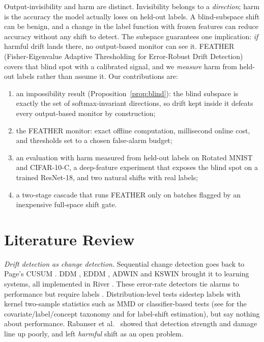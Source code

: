 \documentclass[conference]{IEEEtran}
\begin{document}
Output-invisibility and harm are distinct. Invisibility belongs to a
\emph{direction}; harm is the accuracy the model actually loses on held-out
labels. A blind-subspace shift can be benign, and a change in the label
function with frozen features can reduce accuracy without any shift to detect.
The subspace guarantees one implication: \emph{if} harmful drift lands there,
no output-based monitor can see it. FEATHER (Fisher-Eigenvalue Adaptive
Thresholding for Error-Robust Drift Detection) covers that blind spot with a
calibrated signal, and we \emph{measure} harm from held-out labels rather than
assume it. Our contributions are:
\begin{enumerate}
  \item an impossibility result (Proposition~\ref{prop:blind}): the blind
    subspace is exactly the set of softmax-invariant directions, so drift kept
    inside it defeats every output-based monitor by construction;
  \item the FEATHER monitor: exact offline computation, millisecond online
    cost, and thresholds set to a chosen false-alarm budget;
  \item an evaluation with harm measured from held-out labels on Rotated MNIST
    and CIFAR-10-C, a deep-feature experiment that exposes the blind spot on a
    trained ResNet-18, and two natural shifts with real labels;
  \item a two-stage cascade that runs FEATHER only on batches flagged by an
    inexpensive full-space shift gate.
\end{enumerate}

\section{Literature Review}
\label{sec:related}

\textit{Drift detection as change detection.}
Sequential change detection goes back to Page's CUSUM \cite{page1954cusum}.
DDM \cite{gama2004learning}, EDDM \cite{baena2006eddm}, ADWIN
\cite{bifet2007adwin} and KSWIN \cite{raab2020kswin} brought it to learning
systems, all implemented in River \cite{montiel2021river}. These error-rate
detectors tie alarms to performance but require labels
\cite{gama2014survey, lu2018learning}. Distribution-level tests sidestep
labels with kernel two-sample statistics such as MMD \cite{gretton2012kernel}
or classifier-based tests (see \cite{quinonero2009dataset} for the
covariate/label/concept taxonomy and \cite{lipton2018label} for label-shift
estimation), but say nothing about performance. Rabanser et al.\
\cite{rabanser2019failing} showed that detection strength and damage line up
poorly, and left \emph{harmful} shift as an open problem.
\end{document}
